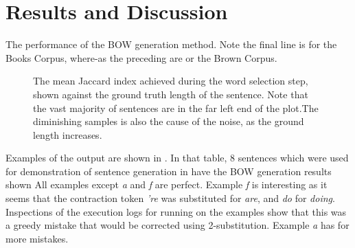 \documentclass{llncs}
\begin{document}
\section{Results and Discussion} \label{results}



\begin{table}
	\caption{ The performance of the BOW generation method. Note the final line is for the Books Corpus, where-as the preceding are or the Brown Corpus.}
	\label{table:overall}
\end{table}


\begin{figure}




	\caption{The mean Jaccard index achieved during the word selection step, shown against the ground truth length of the sentence. Note that the vast majority of sentences are in the far left end of the plot.The diminishing samples is also the cause of the noise, as the ground length increases.}
	\label{figure:exactlenscore}
\end{figure}




Examples of the output are shown in . In that table, 8 sentences which were used for demonstration of sentence generation in \textcite{iyyer2014generating,Bowman2015SmoothGeneration} have the BOW generation results shown All examples except \emph{a} and \emph{f} are perfect. Example \emph{f} is interesting as it seems that the contraction token \emph{'re} was substituted for \emph{are}, and \emph{do} for \emph{doing}. Inspections of the execution logs for running on the examples show that this was a greedy mistake that would be corrected using 2-substitution.  Example \emph{a} has for more mistakes.
\end{document}
